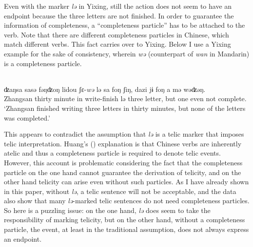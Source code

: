 \documentclass[output=paper]{langsci/langscibook}
\begin{document}
Even with the marker \emph{lə} in Yixing, still the action
does not seem to have an endpoint because the three letters are not finished.
In order to guarantee the information of completeness, a ``completeness
particle'' has to be attached to the verb. Note that there are different
completeness particles in Chinese, which match different verbs. This fact
carries over to Yixing. Below I use a Yixing example for the sake of
consistency, wherein \emph{wə} (counterpart of \emph{wan} in Mandarin) is a
completeness particle.

\begin{exe}
    \ex\label{*completeness} \\
    \gll ʣaŋsa {sasə} {fəŋʣoŋ} lidou {ʃε-\emph{wə}} {lə} sa {foŋ} {ʃiŋ},
    \llap{*}dazi {jɨ} {foŋ} a {mə} wəʣəŋ. \\
    Zhangsan thirty minute in write-finish {lə} three \Clf{} letter, but one \Clf{} even not complete. \\
    \glt \enquote*{Zhangsan finished writing three letters in thirty minutes,
    but none of the letters was completed.}\footnotemark
\end{exe}

This appears to contradict the assumption that \emph{lə} is a telic marker that
imposes telic interpretation. Huang's (\citeyear{huang2015syntactic})
explanation is that Chinese verbs are inherently atelic and thus a completeness
particle is required to denote telic events. However, this account is
problematic considering the fact that the completeness particle on the one hand
cannot guarantee the derivation of telicity, and on the other hand telicity can
arise even without such particles. As I have already shown in this paper,
without \emph{lə}, a telic sentence will not be acceptable, and the data also
show that many \emph{lə}-marked telic sentences do not need completeness
particles. So here is a puzzling issue: on the one hand, \emph{lə} does seem to
take the responsibility of marking telicity, but on the other hand, without a
completeness particle, the event, at least in the traditional assumption, does
not always express an endpoint.
\end{document}
